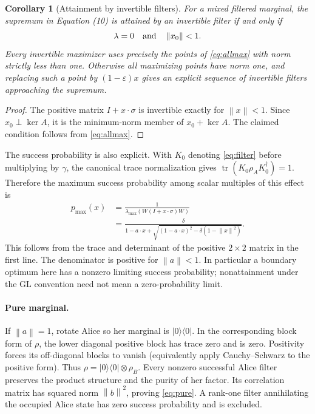 \documentclass[11pt]{article}
\newtheorem{corollary}[theorem]{Corollary}
\theoremstyle{remark}\newtheorem{remark}[theorem]{Remark}
\newcommand{\tr}{\operatorname{tr}}
\newcommand{\norm}[1]{\left\lVert#1\right\rVert}
\begin{document}
\begin{corollary}[Attainment by invertible filters]\label{cor:attain}
For a mixed filtered marginal, the supremum in Equation (10) is attained by
an invertible filter if and only if
\begin{equation}\label{eq:glcriterion}
 \lambda=0\quad\hbox{and}\quad\norm{x_0}<1.
\end{equation}
Every invertible maximizer uses precisely the points of \eqref{eq:allmax}
with norm strictly less than one. Otherwise all maximizing points have norm
one, and replacing such a point by $(1-\varepsilon)x$ gives an explicit
sequence of invertible filters approaching the supremum.
\end{corollary}
\begin{proof}
The positive matrix $I+x\cdot\sigma$ is invertible exactly for $\norm x<1$.
Since $x_0\perp\ker A$, it is the minimum-norm member of $x_0+\ker A$.
The claimed condition follows from \eqref{eq:allmax}.
\end{proof}

The success probability is also explicit. With $K_0$ denoting
\eqref{eq:filter} before multiplying by $\gamma$, the canonical trace
normalization gives $\tr(K_0\rho_AK_0^\dagger)=1$. Therefore the maximum
success probability among scalar multiples of this effect is
\begin{align}\label{eq:success}
 p_{\max}(x)&=\frac1{\lambda_{\max}(W(I+x\cdot\sigma)W)}\\
 &=\frac{\delta}{1-a\cdot x+
 \sqrt{(1-a\cdot x)^2-\delta(1-\norm x^2)}}.\nonumber
\end{align}
This follows from the trace and determinant of the positive $2\times2$
matrix in the first line. The denominator is positive for $\norm a<1$.
In particular a boundary optimum here has a nonzero limiting success
probability; nonattainment under the GL convention need not mean a
zero-probability limit.

\paragraph{Pure marginal.}
If $\norm a=1$, rotate Alice so her marginal is $|0\rangle\langle0|$.
In the corresponding block form of $\rho$, the lower diagonal positive
block has trace zero and is zero. Positivity forces its off-diagonal blocks
to vanish (equivalently apply Cauchy--Schwarz to the positive form).
Thus $\rho=|0\rangle\langle0|\otimes\rho_B$. Every nonzero successful
Alice filter preserves the product structure and the purity of her factor.
Its correlation matrix has squared norm $\norm b^2$, proving
\eqref{eq:pure}. A rank-one filter annihilating the occupied Alice state has
zero success probability and is excluded.
\end{document}
